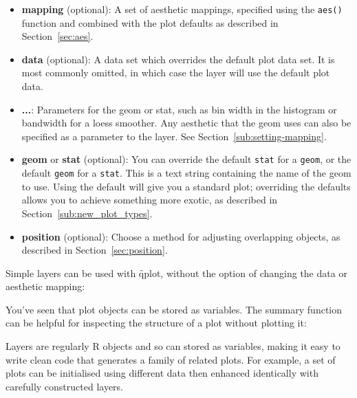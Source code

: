 \begin{itemize}
  \item {\bf mapping} (optional): A set of aesthetic mappings, specified using the {\tt aes()} function and combined with the plot defaults as described in Section~\ref{sec:aes}.

  \item {\bf data} (optional): A data set which overrides the default plot data set.  It is most commonly omitted, in which case the layer will use the default plot data.
  
  \item {\bf ...}: Parameters for the geom or stat, such as bin width in the histogram or bandwidth for a loess smoother.  Any aesthetic that the geom uses can also be specified as a parameter to the layer.  See Section~\ref{sub:setting-mapping}.
  
  \item {\bf geom} or {\bf stat} (optional):  You can override the default {\tt stat} for a {\tt geom}, or the default {\tt geom} for a {\tt stat}.  This is a text string containing the name of the geom to use.  Using the default will give you a standard plot; overriding the defaults allows you to achieve something more exotic, as described in Section~\ref{sub:new_plot_types}.

  \item {\bf position} (optional): Choose a method for adjusting overlapping objects, as described in Section~\ref{sec:position}.
  
\end{itemize}

Simple layers can be used with \f{qplot}, without the option of changing the data or aesthetic mapping:

% 


You've seen that plot objects can be stored as variables. The summary function can be helpful for inspecting the structure of a plot without plotting it:

%
%


Layers are regularly R objects and so can stored as variables, making it easy to write clean code that generates a family of related plots.  For example, a set of plots can be initialised using different data then enhanced identically with carefully constructed layers.

